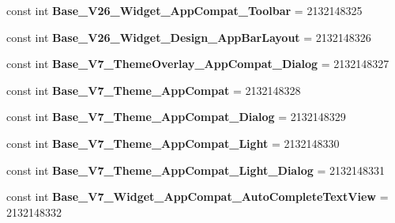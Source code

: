 \begin{DoxyCompactItemize}
\item 
\mbox{\label{classst_delivery_1_1_resource_1_1_style_af0180b1517cc4e859dccee301511857b}} 
const int {\bfseries Base\+\_\+\+V26\+\_\+\+Widget\+\_\+\+App\+Compat\+\_\+\+Toolbar} = 2132148325
\item 
\mbox{\label{classst_delivery_1_1_resource_1_1_style_ab11ec593eca16162ed9aea9fc666bc2f}} 
const int {\bfseries Base\+\_\+\+V26\+\_\+\+Widget\+\_\+\+Design\+\_\+\+App\+Bar\+Layout} = 2132148326
\item 
\mbox{\label{classst_delivery_1_1_resource_1_1_style_a34569c17a68e3d3a1bdf47727b4e58c1}} 
const int {\bfseries Base\+\_\+\+V7\+\_\+\+Theme\+Overlay\+\_\+\+App\+Compat\+\_\+\+Dialog} = 2132148327
\item 
\mbox{\label{classst_delivery_1_1_resource_1_1_style_a46d5a94080b64afdd895559598c693df}} 
const int {\bfseries Base\+\_\+\+V7\+\_\+\+Theme\+\_\+\+App\+Compat} = 2132148328
\item 
\mbox{\label{classst_delivery_1_1_resource_1_1_style_a9eb9b0c58f40bf3146f704a4d650ef35}} 
const int {\bfseries Base\+\_\+\+V7\+\_\+\+Theme\+\_\+\+App\+Compat\+\_\+\+Dialog} = 2132148329
\item 
\mbox{\label{classst_delivery_1_1_resource_1_1_style_a4416f81d842d95c514f7c353603837c1}} 
const int {\bfseries Base\+\_\+\+V7\+\_\+\+Theme\+\_\+\+App\+Compat\+\_\+\+Light} = 2132148330
\item 
\mbox{\label{classst_delivery_1_1_resource_1_1_style_af1456afced77cf30aa4d507c2d8a58d1}} 
const int {\bfseries Base\+\_\+\+V7\+\_\+\+Theme\+\_\+\+App\+Compat\+\_\+\+Light\+\_\+\+Dialog} = 2132148331
\item 
\mbox{\label{classst_delivery_1_1_resource_1_1_style_a4b842704e38fbaf2497652a3d2425744}} 
const int {\bfseries Base\+\_\+\+V7\+\_\+\+Widget\+\_\+\+App\+Compat\+\_\+\+Auto\+Complete\+Text\+View} = 2132148332
\item 

\end{DoxyCompactItemize}
